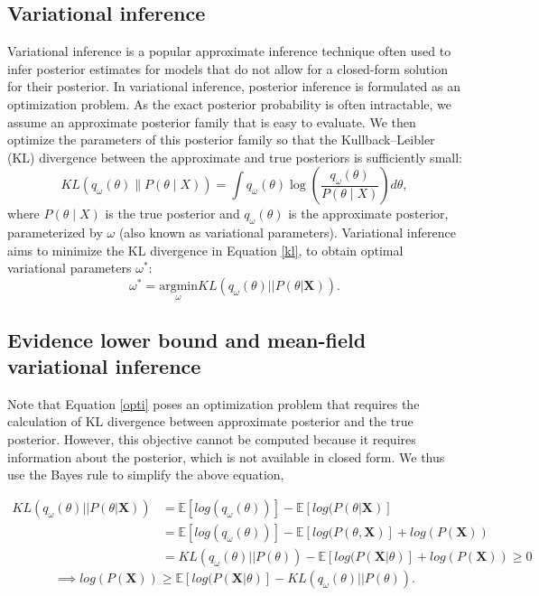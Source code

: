\subsection{Variational inference}
Variational inference is a popular approximate inference technique often used to infer posterior estimates for models that do not allow for a closed-form solution for their posterior.
%
In variational inference, posterior inference is formulated as an optimization problem.
%
As the exact posterior probability is often intractable, we assume an approximate posterior family that is easy to evaluate.
%
We then optimize the parameters of this posterior family so that the Kullback–Leibler (KL) divergence between the approximate and true posteriors is sufficiently small:
\begin{equation}
    KL\left(q_{\omega} (\theta) \| P(\theta \mid X) \right) = \int q_{\omega} (\theta) \log \left( \frac{q_{\omega} (\theta)}{P(\theta \mid X)} \right) d \theta \label{kl},
\end{equation}
where $P(\theta \mid X)$ is the true posterior and $q_{\omega} (\theta)$ is the approximate posterior, parameterized by $\omega$ (also known as variational parameters).
%
Variational inference aims to minimize the KL divergence in Equation \ref{kl}, to obtain optimal variational parameters $\omega^{*}$: 
\begin{equation}
    \omega^{*} = \underset{\omega}{\mathrm{argmin}}KL(q_{\omega}(\theta)||P(\theta|\textbf{X})).
    \label{opti}
\end{equation}

\subsection{Evidence lower bound and mean-field variational inference}
\label{sec:ch4-theory-mfvi}
Note that Equation \ref{opti} poses an optimization problem that requires the calculation of KL divergence between approximate posterior and the true posterior.
%
However, this objective cannot be computed because it requires information about the posterior, which is not available in closed form.
%
We thus use the Bayes rule to simplify the above equation,
%

\begin{align}
    KL(q_{\omega}(\theta)||P(\theta|\textbf{X})) &= \mathbb{E}[log(q_{\omega}(\theta))] -\mathbb{E}[log(P(\theta|\textbf{X})] \nonumber \\
&= \mathbb{E}[log(q_{\omega}(\theta))] -\mathbb{E}[log(P(\theta,\textbf{X})] + log(P(\textbf{X})) \nonumber \\
& = KL(q_{\omega}(\theta)||P(\theta)) -  \mathbb{E}[log(P( \textbf{X}|\theta)] + log(P(\textbf{X})) \geq 0
\end{align} 
\begin{equation}
    \implies log(P(\textbf{X})) \geq \mathbb{E}[log(P( \textbf{X}|\theta)] - KL(q_{\omega}(\theta)||P(\theta)) \label{elbo_bound}.
\end{equation}

